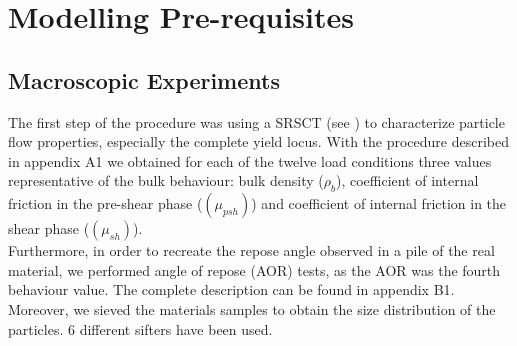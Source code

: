 \section{Modelling Pre-requisites}
\label{sec:modellingprerequisites}


\subsection{Macroscopic Experiments}
\label{subsec:Macroscopicexperiments}

The first step of the procedure was using a SRSCT (see \cite{RefWorks:142}) to characterize particle flow properties, 
especially the complete yield locus.
With the procedure described in appendix A1 we obtained for each of the twelve load conditions 
three values representative of the bulk behaviour: bulk density ($\rho_b$),
coefficient of internal friction in the pre-shear phase ($ (\mu_{psh})$) and
coefficient of internal friction in the shear phase  ($ (\mu_{sh})$).\\
Furthermore, in order to recreate the repose angle observed in a pile of the real material, we performed angle of repose (AOR) tests, as the AOR was the fourth behaviour value. The complete description can be found in appendix B1.
Moreover, we sieved the materials samples to obtain the size distribution of the particles. 6 different sifters have been used.



